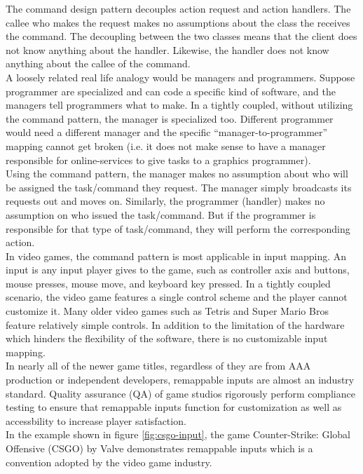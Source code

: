 \begin{multicols}{2}
The command design pattern decouples action request and action handlers. The callee who makes the request makes no assumptions about the class the receives the command. The decoupling between the two classes means that the client does not know anything about the handler. Likewise, the handler does not know anything about the callee of the command.\bs
\\
A loosely related real life analogy would be managers and programmers. Suppose programmer are specialized and can code a specific kind of software, and the managers tell programmers what to make. In a tightly coupled, without utilizing the command pattern, the manager is specialized too. Different programmer would need a different manager and the specific ``manager-to-programmer'' mapping cannot get broken (i.e. it does not make sense to have a manager responsible for online-services to give tasks to a graphics programmer).\bs
\\
Using the command pattern, the manager makes no assumption about who will be assigned the task/command they request. The manager simply broadcasts its requests out and moves on. Similarly, the programmer (handler) makes no assumption on who issued the task/command. But if the programmer is responsible for that type of task/command, they will perform the corresponding action.\bs
\\
In video games, the command pattern is most applicable in input mapping. An input is any input player gives to the game, such as controller axis and buttons, mouse presses, mouse move, and keyboard key pressed. In a tightly coupled scenario, the video game features a single control scheme and the player cannot customize it. Many older video games such as Tetris\cite{nes-tetris} and Super Mario Bros \cite{nes-mario} feature relatively simple controls. In addition to the limitation of the hardware which hinders the flexibility of the software, there is no customizable input mapping.\bs
\\
In nearly all of the newer game titles, regardless of they are from AAA production or independent developers, remappable inputs are almost an industry standard. Quality assurance (QA) of game studios rigorously perform compliance testing to ensure that remappable inputs function for customization as well as accessbility to increase player satisfaction.\bs
\\
In the example shown in figure \ref{fig:csgo-input}\cite{csgo-input}, the game Counter-Strike: Global Offensive (CSGO) by Valve demonstrates remappable inputs which is a convention adopted by the video game industry.


\end{multicols}
